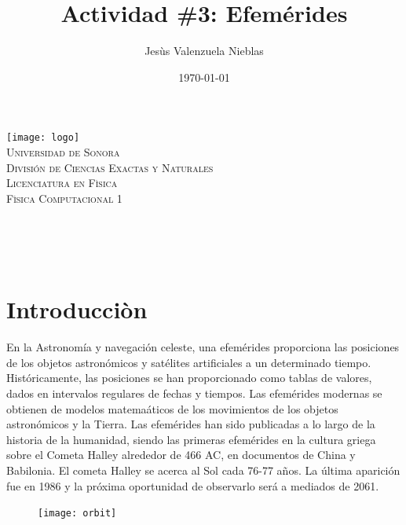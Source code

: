 \documentclass[12pt]{article}
\title{Actividad \#3: Efemérides }
\author{\Large Jesùs Valenzuela Nieblas\\}
\date{\today}
\makeatletter
\let\thetitle\@title
\let\theauthor\@author
\let\thedate\@date
\makeatother
\begin{document}

\begin{titlepage}
	\centering
    \vspace*{.5cm}
     \texttt{[image: logo]}\\	%
    \textsc{\Large Universidad de Sonora}\\[1.0 cm]	%
	\textsc{\Large División de Ciencias Exactas y Naturales}\\[.50 cm]
  	\textsc{\Large Licenciatura en Fìsica}\\[.5 cm]
  \textsc{\large Fìsica Computacional 1}\\[1.5 cm]				%
	
	{ \huge \bfseries \thetitle}\\

    \vspace*{3 cm}
	\begin{minipage}{\textwidth}
    \centering
    \theauthor
	\end{minipage}\\[3 cm]
	{\large \thedate}\\[2 cm]
 
	\vfill
	
\end{titlepage}


\section{Introducciòn}
En la Astronomía y navegación celeste, una efemérides proporciona las posiciones de los objetos astronómicos y satélites artificiales a un determinado tiempo. Históricamente, las posiciones se han proporcionado como tablas de valores, dados en intervalos regulares de fechas y tiempos. Las efemérides modernas se obtienen de modelos matemaáticos de los movimientos de los objetos astronómicos y la Tierra. 
Las efemérides han sido publicadas a lo largo de la historia de la humanidad, siendo las primeras efemérides en la cultura griega sobre el Cometa Halley alrededor de 466 AC, en  documentos de China y Babilonia. El cometa Halley se acerca al Sol cada 76-77 años. La última aparición fue en 1986 y la próxima oportunidad de observarlo será a mediados de 2061.
\begin{figure}[H]
\centering
\texttt{[image: orbit]}
\end{figure}
\end{document}

